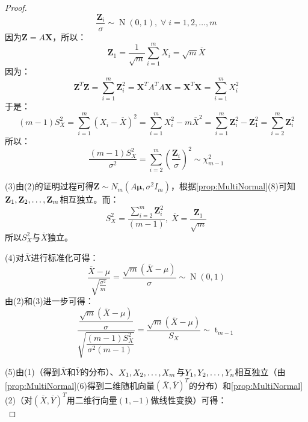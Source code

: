 \begin{proof}
	\begin{equation*}
		\frac{\mathbf{Z}_i}{\sigma}\sim \operatorname{N}(0,1),\;\forall\;i=1,2,\dots,m
	\end{equation*}
	因为$\mathbf{Z}=A\mathbf{X}$，所以：
	\begin{equation*}
		\mathbf{Z}_1=\frac{1}{\sqrt{m}}\sum_{i=1}^{m}X_i=\sqrt{m}\overline{X}
	\end{equation*}
	因为：
	\begin{equation*}
		\mathbf{Z}^T\mathbf{Z}=\sum_{i=1}^{m}\mathbf{Z}_i^2=\mathbf{X}^TA^TA\mathbf{X}=\mathbf{X}^T\mathbf{X}=\sum_{i=1}^{m}X_i^2
	\end{equation*}
	于是：
	\begin{equation*}
		(m-1)S_X^2=\sum_{i=1}^{m}(X_i-\overline{X})^2=\sum_{i=1}^{m}X_i^2-m\overline{X}^2=\sum_{i=1}^{m}\mathbf{Z}_i^2-\mathbf{Z}_1^2=\sum_{i=2}^{m}\mathbf{Z}_i^2
	\end{equation*}
	所以：
	\begin{equation*}
		\frac{(m-1)S_X^2}{\sigma^2}=\sum_{i=2}^{m}\left(\frac{\mathbf{Z}_i}{\sigma}\right)^2\sim\chi_{m-1}^2
	\end{equation*}\par
	(3)由(2)的证明过程可得$\mathbf{Z}\sim N_m(A\boldsymbol{\mu},\sigma^2I_m)$，根据\cref{prop:MultiNormal}(8)可知$\mathbf{Z}_1, \mathbf{Z}_2, \dots, \mathbf{Z}_{m}$相互独立。而：
	\begin{equation*}
		S_X^2=\frac{\sum\limits_{i=2}^{m}\mathbf{Z}_i^2}{(m-1)},\;\overline{X}=\frac{\mathbf{Z}_1}{\sqrt{m}}
	\end{equation*}
	所以$S_X^2$与$\overline{X}$独立。\par
	(4)对$\overline{X}$进行标准化可得：
	\begin{equation*}
		\frac{\overline{X}-\mu}{\sqrt{\frac{\sigma^2}{m}}}=\frac{\sqrt{m}(\overline{X}-\mu)}{\sigma}\sim\operatorname{N}(0,1)
	\end{equation*}
	由(2)和(3)进一步可得：
	\begin{equation*}
		\frac{\dfrac{\sqrt{m}(\overline{X}-\mu)}{\sigma}}{\sqrt{\dfrac{(m-1)S_X^2}{\sigma^2(m-1)}}}=\frac{\sqrt{m}(\overline{X}-\mu)}{S_X}\sim \operatorname{t}_{m-1}
	\end{equation*}\par
	(5)由(1)（得到$\overline{X}$和$\overline{Y}$的分布）、$X_1, X_2, \dots, X_{m}$与$Y_1, Y_2, \dots, Y_{n}$相互独立（由\cref{prop:MultiNormal}(6)得到二维随机向量$(\overline{X},\overline{Y})^T$的分布）和\cref{prop:MultiNormal}(2)（对$(\overline{X},\overline{Y})^T$用二维行向量$(1,-1)$做线性变换）可得：
	\begin{equation*}

\end{equation*}
\end{proof}
